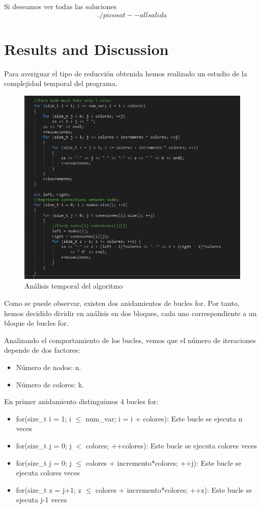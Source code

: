 \documentclass{article}
\begin{document}
        Si deseamos ver todas las soluciones 
        \[./picosat --all salida\]


\section{Results and Discussion}
    Para averiguar el tipo de reducción obtenida hemos realizado un estudio de la complejidad temporal del programa. 
    \begin{figure}[H]
        \centering
        \includegraphics[width=1\textwidth]{pictures/analisis.png}
        \caption{Análisis temporal del algoritmo}
    \end{figure}
    Como se puede observar, existen dos anidamientos de bucles for. Por tanto, hemos decidido dividir en análisis en dos bloques, 
    cada uno correspondiente a un bloque de bucles for. 

    Analizando el comportamiento de los bucles, vemos que el número de iteraciones depende de dos factores: 
    \begin{itemize}
        \item Número de nodos: n.
        \item Número de colores: k.
    \end{itemize}
    En primer anidamiento distinguimos 4 bucles for:
    \begin{itemize}
        \item for(size\_t i = 1; i $\leq$ num\_var; i = i + colores): Este bucle se ejecuta n veces
        \item for(size\_t j = 0; j $<$ colores; ++colores): Este bucle se ejecuta colores veces
        \item for(size\_t j = 0; j $\leq$ colores + incremento*colores; ++j): Este bucle se ejecuta colores veces
        \item for(size\_t z = j+1; z $\leq$ colores + incremento*colores; ++z): Este bucle se ejecuta j-1 veces
    \end{itemize}
\end{document}
